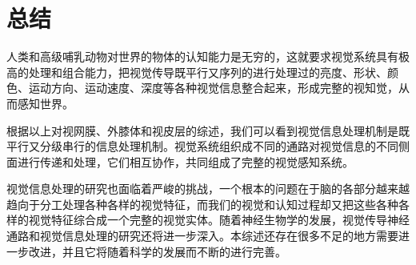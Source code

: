 \documentclass[a4paper,12pt]{article}
\begin{document}
\section{总结}



人类和高级哺乳动物对世界的物体的认知能力是无穷的\cite{15:book}，这就要求视觉系统具有极高的处理和组合能力，把视觉传导既平行又序列的进行处理过的亮度、形状、颜色、运动方向、运动速度、深度等各种视觉信息整合起来，形成完整的视知觉，从而感知世界。
        

根据以上对视网膜、外膝体和视皮层的综述，我们可以看到视觉信息处理机制是既平行又分级串行的信息处理机制\cite{16:book}。视觉系统组织成不同的通路对视觉信息的不同侧面进行传递和处理，它们相互协作，共同组成了完整的视觉感知系统。
        


视觉信息处理的研究也面临着严峻的挑战，一个根本的问题在于脑的各部分越来越趋向于分工处理各种各样的视觉特征，而我们的视觉和认知过程却又把这些各种各样的视觉特征综合成一个完整的视觉实体\cite{17:book}。随着神经生物学的发展，视觉传导神经通路和视觉信息处理的研究还将进一步深入。本综述还存在很多不足的地方需要进一步改进，并且它将随着科学的发展而不断的进行完善。
\newpage


\end{document}
